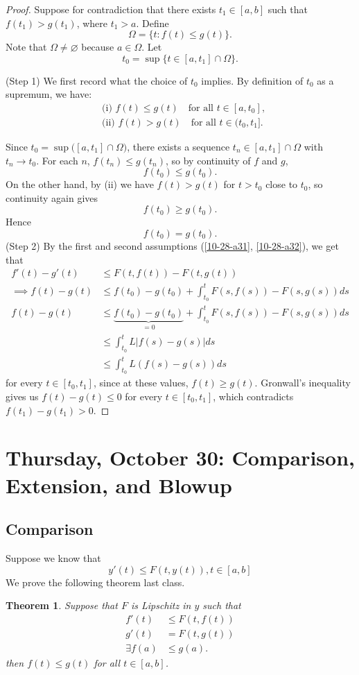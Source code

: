 \documentclass{tufte-handout}
\let\O\varnothing
\newtheorem{thm}{Theorem}[subsection]
\theoremstyle{definition}
\begin{document}
\begin{proof}
	Suppose for contradiction that there exists $t_1 \in [a,b]$ such that $f(t_1) > g(t_1)$, where $t_1 > a$. 
	Define \[
		\Omega = \{t : f(t) \le g(t)\}
	.\] Note that $\Omega \ne \O$ because $a \in \Omega$. Let \[
	t_0 = \sup \{t \in [a,t_1] \cap  \Omega\}
	.\] 

	(Step 1) We first record what the choice of $t_0$ implies. By definition of $t_0$ as a supremum, we have:
	\begin{align*}
		&\text{(i) } f(t) \le g(t) \quad \text{for all } t \in [a,t_0], \\
		&\text{(ii) } f(t) > g(t) \quad \text{for all } t \in (t_0,t_1].
	\end{align*}

	Since $t_0 = \sup\big( [a,t_1] \cap \Omega \big)$, there exists a sequence
	$t_n \in [a,t_1] \cap \Omega$ with $t_n \to t_0$. For each $n$,
	$f(t_n) \le g(t_n)$, so by continuity of $f$ and $g$,
	\[
		f(t_0) \le g(t_0).
	\]
	On the other hand, by (ii) we have $f(t) > g(t)$ for $t > t_0$ close to $t_0$,
	so continuity again gives
	\[
		f(t_0) \ge g(t_0).
	\]
	Hence
	\[
		f(t_0) = g(t_0).
	\]
	(Step 2) By the first and second assumptions (\ref{10-28-a31}, \ref{10-28-a32}), we get that
	\begin{align*}
		f'(t) - g'(t) &\le F(t,f(t)) - F(t,g(t)) \\
		\implies f(t) - g(t) &\le f(t_0) -g(t_0) + \int_{t_0}^{t} F(s,f(s)) - F(s,g(s))ds \\
		f(t) - g(t) &\le \underbrace{f(t_0) - g(t_0)}_{=0} + \int_{t_0}^{t} F(s,f(s)) - F(s,g(s))ds \\
					&\le \int_{t_0}^{t} L \left| f(s) - g(s) \right|ds \\
					&\le \int_{t_0}^{t} L (f(s) - g(s))ds 
	\end{align*}
	for every $t \in [t_0,t_1]$, since at these values, $f(t) \ge g(t)$.
	Gronwall's inequality gives us $f(t) - g(t) \le 0$ for every $t \in [t_0,t_1]$, which contradicts $f(t_1) - g(t_1) > 0$.
\end{proof}

\section{Thursday, October 30: Comparison, Extension, and Blowup}
\subsection{Comparison}
Suppose we know that
\begin{equation}
	y'(t) \le F(t,y(t)), t \in [a,b] \label{10-30-1}
\end{equation}
We prove the following theorem last class.
\begin{thm}
	Suppose that $F$ is Lipschitz in $y$ such that 
	\begin{align}
		f'(t) &\le F(t,f(t)) \label{10-30a1} \\
		g'(t) &= F(t,g(t)) \label{10-30a2} \\
		\exists f(a) &\le g(a).
	\end{align}
	then $f(t) \le g(t)$ for all $t \in [a,b]$.
\end{thm}
\end{document}
